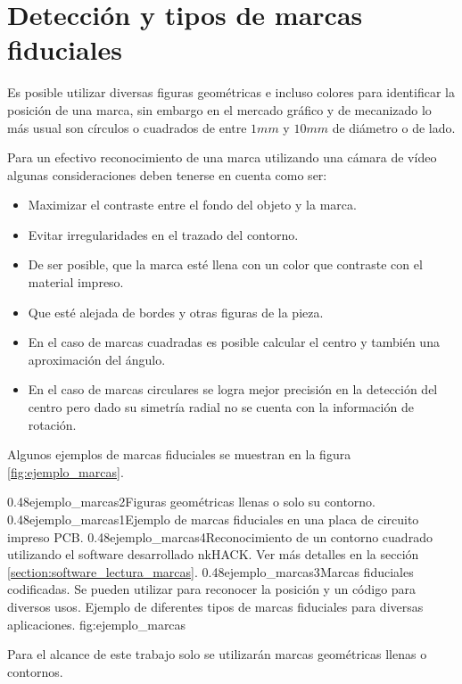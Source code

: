 \section{Detección y tipos de marcas fiduciales}
   Es posible utilizar diversas figuras geométricas e incluso colores para identificar la posición de una marca, sin embargo en el mercado gráfico y de mecanizado lo más usual son círculos o cuadrados de entre $1 mm$ y $10 mm$ de diámetro o de lado.\par
   Para un efectivo reconocimiento de una marca utilizando una cámara de vídeo algunas consideraciones deben tenerse en cuenta como ser:
   \begin{itemize}
      \item{Maximizar el contraste entre el fondo del objeto y la marca.}
      \item{Evitar irregularidades en el trazado del contorno.}
      \item{De ser posible, que la marca esté llena con un color que contraste con el material impreso.}
      \item{Que esté alejada de bordes y otras figuras de la pieza.}
      \item{En el caso de marcas cuadradas es posible calcular el centro y también una aproximación del ángulo.}
      \item{En el caso de marcas circulares se logra mejor precisión en la detección del centro pero dado su simetría radial no se cuenta con la información de rotación.}
   \end{itemize}
   Algunos ejemplos de marcas fiduciales se muestran en la figura \ref{fig:ejemplo_marcas}.

\subfigtwotwo
            {0.48}{ejemplo_marcas2}{Figuras geométricas llenas o solo su contorno.} 
            {0.48}{ejemplo_marcas1}{Ejemplo de marcas fiduciales en una placa de circuito impreso PCB.}
            {0.48}{ejemplo_marcas4}{Reconocimiento de un contorno cuadrado utilizando el software desarrollado nkHACK. Ver más detalles en la sección \ref{section:software_lectura_marcas}.}
            {0.48}{ejemplo_marcas3}{Marcas fiduciales codificadas. Se pueden utilizar para reconocer la posición y un código para diversos usos.}
            {Ejemplo de diferentes tipos de marcas fiduciales para diversas aplicaciones.}
            {fig:ejemplo_marcas}

         Para el alcance de este trabajo solo se utilizarán marcas geométricas llenas o contornos.


